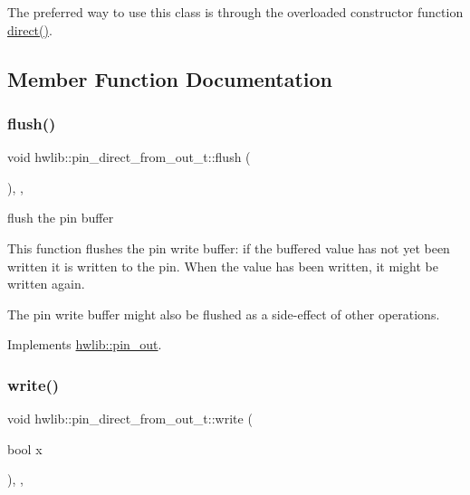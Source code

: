 The preferred way to use this class is through the overloaded constructor function \hyperlink{namespacehwlib_a43941b7f246ad934ee43dbfa0f5c8b5a}{direct()}. 

\subsection{Member Function Documentation}
\mbox{\label{classhwlib_1_1pin__direct__from__out__t_af623d47b7d7b8b0878a9ac359a3668d8}} 
\subsubsection{\texorpdfstring{flush()}{flush()}}
{\footnotesize\ttfamily void hwlib\+::pin\+\_\+direct\+\_\+from\+\_\+out\+\_\+t\+::flush (\begin{DoxyParamCaption}{ }\end{DoxyParamCaption})\hspace{0.3cm}{\ttfamily [inline]}, {\ttfamily [override]}, {\ttfamily [virtual]}}





flush the pin buffer

This function flushes the pin write buffer\+: if the buffered value has not yet been written it is written to the pin. When the value has been written, it might be written again.

The pin write buffer might also be flushed as a side-\/effect of other operations. 

Implements \hyperlink{classhwlib_1_1pin__out_ac22910317477a52431a44e7e3c66fc57}{hwlib\+::pin\+\_\+out}.

\mbox{\label{classhwlib_1_1pin__direct__from__out__t_aa6a52997e8ceb4c0c6489253f84264db}} 
\subsubsection{\texorpdfstring{write()}{write()}}
{\footnotesize\ttfamily void hwlib\+::pin\+\_\+direct\+\_\+from\+\_\+out\+\_\+t\+::write (\begin{DoxyParamCaption}\item[{bool}]{x }\end{DoxyParamCaption})\hspace{0.3cm}{\ttfamily [inline]}, {\ttfamily [override]}, {\ttfamily [virtual]}}





